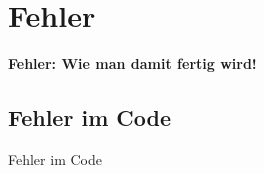 \section{Fehler}
\begin{frame}[c]
	\begin{center}
		\LARGE \textbf{Fehler: Wie man damit fertig wird!}
	\end{center}
\end{frame}
\subsection{Fehler im Code}
\begin{frame}[c]
	\begin{center}
		\large Fehler im Code
	\end{center}
\end{frame}
